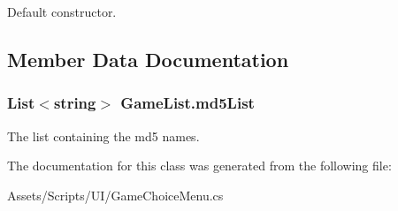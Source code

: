 Default constructor.



\subsection{Member Data Documentation}
\hypertarget{class_game_list_afc6e6771320345df43529222f5942d52}{
\subsubsection[{md5\-List}]{\setlength{\rightskip}{0pt plus 5cm}List$<$string$>$ Game\-List.\-md5\-List}}\label{class_game_list_afc6e6771320345df43529222f5942d52}


The list containing the md5 names.



The documentation for this class was generated from the following file\-:\begin{DoxyCompactItemize}
\item 
Assets/\-Scripts/\-U\-I/Game\-Choice\-Menu.\-cs\end{DoxyCompactItemize}
